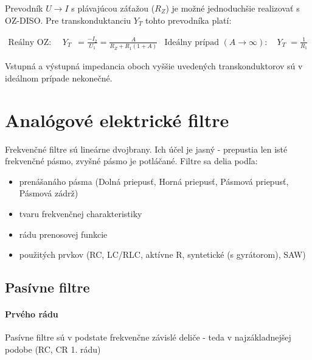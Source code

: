 Prevodník $U \to I$ s plávajúcou záťažou ($R_Z$) je možné jednoduchšie realizovať s OZ-DISO. Pre transkonduktanciu $Y_T$ tohto prevodníka platí:

\begin{align*}
	\text{Reálny OZ: } \quad Y_T &= \frac{-I_2}{U_1} = \frac{A}{R_Z + R_1(1 + A)}
	&
	\text{Ideálny prípad } (A \to \infty): \quad Y_T &= \frac{1}{R_1}
\end{align*}

Vstupná a výstupná impedancia oboch vyššie uvedených transkonduktorov sú v ideálnom prípade nekonečné.
\newpage
\chapter{Analógové elektrické filtre}
Frekvenčné filtre sú lineárne dvojbrany. Ich účel je jasný - prepustia len isté frekvenčné pásmo, zvyšné pásmo je potláčané. Filtre sa delia podľa:
\begin{itemize}
	\item prenášanáho pásma (Dolná priepusť, Horná priepusť, Pásmová priepusť, Pásmová zádrž)
	\item tvaru frekvenčnej charakteristiky
	\item rádu prenosovej funkcie
	\item použitých prvkov (RC, LC/RLC, aktívne R, syntetické (s gyrátorom), SAW)
\end{itemize}


\section{Pasívne filtre}
\subsubsection{Prvého rádu}
Pasívne filtre sú v podstate frekvenčne závislé deliče - teda v najzákladnejšej podobe (RC, CR 1. rádu)

